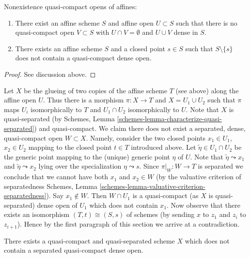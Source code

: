 \begin{lemma}
\label{lemma-complement-of-affine-does-not-contain-qc-dense-open}
Nonexistence quasi-compact opens of affines:
\begin{enumerate}
\item There exist an affine scheme $S$ and affine open $U \subset S$
such that there is no quasi-compact open $V \subset S$ with
$U \cap V = \emptyset$ and $U \cup V$ dense in $S$.
\item There exists an affine scheme $S$ and a closed point $s \in S$ such that
$S \setminus \{s\}$ does not contain a quasi-compact dense open.
\end{enumerate}
\end{lemma}

\begin{proof}
See discussion above.
\end{proof}

\noindent
Let $X$ be the glueing of two copies of the affine scheme $T$ (see above)
along the affine open $U$. Thus there is a morphism $\pi : X \to T$ and
$X = U_1 \cup U_2$ such that $\pi$ maps $U_i$ isomorphically to $T$ and
$U_1 \cap U_2$ isomorphically to $U$. Note that $X$ is quasi-separated
(by Schemes, Lemma \ref{schemes-lemma-characterize-quasi-separated})
and quasi-compact. We claim there does not exist a separated, dense,
quasi-compact open $W \subset X$. Namely, consider the two closed
points $x_1 \in U_1$, $x_2 \in U_2$ mapping to the closed point $t \in T$
introduced above. Let $\tilde \eta \in U_1 \cap U_2$ be the generic point
mapping to the (unique) generic point $\eta$ of $U$.
Note that $\tilde\eta \leadsto x_1$ and $\tilde\eta \leadsto x_2$
lying over the specialization $\eta \leadsto s$.
Since $\pi|_W : W \to T$ is separated we conclude that we cannot have both
$x_1$ and $x_2 \in W$ (by the valuative criterion of separatedness
Schemes, Lemma \ref{schemes-lemma-valuative-criterion-separatedness}).
Say $x_1 \not \in W$. Then $W \cap U_1$ is a quasi-compact (as $X$
is quasi-separated) dense open of $U_1$ which does not contain $x_1$.
Now observe that there exists an isomorphism $(T, t) \cong (S, s)$
of schemes (by sending $x$ to $z_1$ and $z_i$ to $z_{i + 1}$).
Hence by the first paragraph of this section we arrive at a contradiction.

\begin{lemma}
\label{lemma-no-dense-separated-quasi-compact-open-in-qcqs}
There exists a quasi-compact and quasi-separated scheme $X$ which does
not contain a separated quasi-compact dense open.
\end{lemma}

